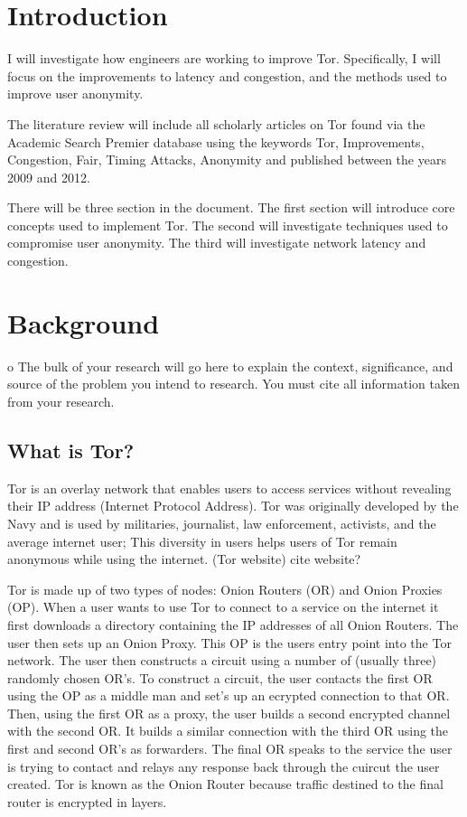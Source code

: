 \documentclass[letterpaper,11pt]{texMemo}
\begin{document}
\singlespace
\maketitle

\section*{Introduction}

I will investigate how engineers are working to improve Tor. Specifically, I will focus on the
improvements to latency and congestion, and the methods used to improve user anonymity.

The literature review will include all scholarly articles on Tor found via the Academic Search
Premier database using the keywords Tor, Improvements, Congestion, Fair, Timing Attacks,
Anonymity and published between the years 2009 and 2012.

There will be three section in the document. The first section will introduce core concepts used
to implement Tor. The second will investigate techniques used to compromise user
anonymity. The third will investigate network latency and congestion.

\section*{Background}

    o The bulk of your research will go here to explain the context, significance,
    and source of the problem you intend to research. You must cite all
    information taken from your research.
    \subsection*{What is Tor?}
    Tor is an overlay network that enables users to access services without revealing their IP
    address (Internet Protocol Address). Tor was originally developed by the Navy and is used by
    militaries, journalist, law enforcement, activists, and the average internet user; This diversity
    in users helps users of Tor remain anonymous while using the internet. (Tor website) %
    cite website?

    Tor is made up of two types of nodes: Onion Routers (OR) and Onion Proxies (OP). When a user wants to use
    Tor to connect to a service on the internet it first downloads a directory containing the IP
    addresses of all Onion Routers. The user then sets up an Onion Proxy. This OP is the users entry
    point into the Tor network. The user then constructs a circuit using a number of (usually three)
    randomly chosen OR's. To construct a circuit, the user contacts the first OR using the OP as a
    middle man and set's up an ecrypted connection to that OR. Then, using the first OR as a proxy,
    the user builds a second encrypted channel with the second OR. It builds a similar connection
    with the third OR using the first and second OR's as forwarders. The final OR speaks to the
    service the user is trying to contact and relays any response back through the cuircut the user
    created. Tor is known as the Onion Router because traffic destined to the final router is
    encrypted in layers.
\end{document}
